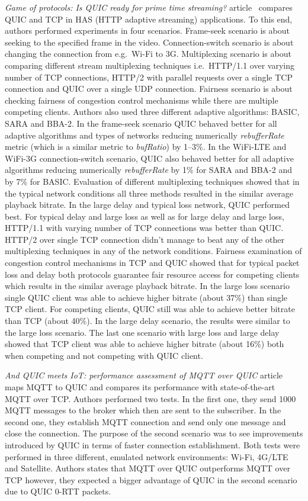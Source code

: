 \textit{Game of protocols: Is QUIC ready for prime time streaming?} article~\cite{game-of-protocols} compares QUIC and TCP in HAS (HTTP adaptive streaming) applications.
To this end, authors performed experiments in four scenarios.
Frame-seek scenario is about seeking to the specified frame in the video.
Connection-switch scenario is about changing the connection from e.g.\ Wi-Fi to 3G\@.
Multiplexing scenario is about comparing different stream multiplexing techniques i.e.\ HTTP/1.1 over varying number of TCP connections, HTTP/2 with parallel requests over a single TCP connection and QUIC over a single UDP connection.
Fairness scenario is about checking fairness of congestion control mechanisms while there are multiple competing clients.
Authors also used three different adaptive algorithms: BASIC, SARA and BBA-2.
In the frame-seek scenario QUIC behaved better for all adaptive algorithms and types of networks reducing numerically \textit{rebufferRate} metric (which is a similar metric to \textit{bufRatio}) by 1--3\%.
In the WiFi-LTE and WiFi-3G connection-switch scenario, QUIC also behaved better for all adaptive algorithms reducing numerically \textit{rebufferRate} by 1\% for SARA and BBA-2 and by 7\% for BASIC\@.
Evaluation of different multiplexing techniques showed that in the typical network conditions all three methods resulted in the similar average playback bitrate.
In the large delay and typical loss network, QUIC performed best.
For typical delay and large loss as well as for large delay and large loss, HTTP/1.1 with varying number of TCP connections was better than QUIC\@.
HTTP/2 over single TCP connection didn't manage to beat any of the other multiplexing techniques in any of the network conditions.
Fairness examination of congestion control mechanisms in TCP and QUIC showed that for typical packet loss and delay both protocols guarantee fair resource access for competing clients which results in the similar average playback bitrate.
In the large loss scenario single QUIC client was able to achieve higher bitrate (about 37\%) than single TCP client.
For competing clients, QUIC still was able to achieve better bitrate than TCP (about 40\%).
In the large delay scenario, the results were similar to the large loss scenario.
The last one scenario with large loss and large delay showed that TCP client was able to achieve higher bitrate (about 16\%) both when competing and not competing with QUIC client.

\textit{And QUIC meets IoT: performance assessment of MQTT over QUIC} article~\cite{and-quic-meets-iot} maps MQTT to QUIC
and compares its performance with state-of-the-art MQTT over TCP\@.
Authors performed two tests.
In the first one, they send 1000 MQTT messages to the broker which then are sent to the subscriber.
In the second one, they establish MQTT connection and send only one message and close the connection.
The purpose of the second scenario was to see improvements introduced by QUIC in terms of faster connection establishment.
Both tests were performed in three different, emulated network environments: Wi-Fi, 4G/LTE and Satellite.
Authors states that MQTT over QUIC outperforms MQTT over TCP however, they expected a bigger advantage
of QUIC in the second scenario due to QUIC 0-RTT packets.

